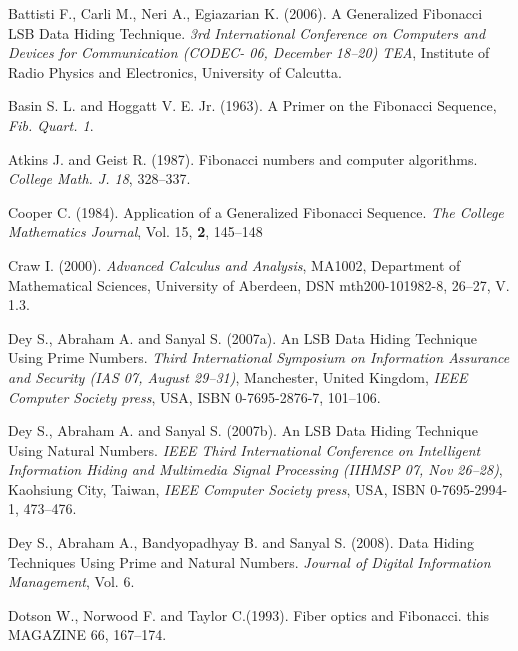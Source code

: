 \documentclass{ijcsa}
\begin{document}
\begin{thebibliography}

Battisti F., Carli M., Neri A., Egiazarian K. (2006). A Generalized Fibonacci LSB Data Hiding
Technique. {\it  3rd International Conference on Computers and Devices for Communication (CODEC-
06, December 18--20) TEA}, Institute of Radio Physics and Electronics, University of Calcutta.

Basin S. L. and Hoggatt V. E. Jr. (1963). A Primer on the Fibonacci Sequence, {\it Fib. Quart. 1}.

Atkins J. and Geist R. (1987). Fibonacci numbers and computer algorithms. {\it College Math. J. 18}, 328--337.

Cooper C. (1984). Application of a Generalized Fibonacci Sequence. {\it The College Mathematics Journal}, {Vol. 15}, {\bf 2}, 145--148

Craw I. (2000). {\it Advanced Calculus and Analysis}, MA1002, Department of Mathematical Sciences, University of Aberdeen,  
DSN mth200-101982-8, 26--27, V. 1.3.

Dey S., Abraham A. and Sanyal S. (2007a). An LSB Data Hiding Technique Using Prime Numbers. {\it Third International Symposium on Information Assurance and Security (IAS 07, August 29--31)}, Manchester, United Kingdom, {\it IEEE Computer Society press}, USA, ISBN 0-7695-2876-7, 101--106. 

Dey S., Abraham A. and Sanyal S. (2007b). An LSB Data Hiding Technique Using Natural Numbers. {\it IEEE Third International Conference on Intelligent Information Hiding and Multimedia Signal Processing (IIHMSP 07, Nov 26--28)}, Kaohsiung City, Taiwan, {\it IEEE Computer Society press}, USA, ISBN 0-7695-2994-1, 473--476. 

Dey S., Abraham A., Bandyopadhyay B. and Sanyal S. (2008). Data Hiding Techniques Using Prime and Natural Numbers.  {\it Journal of Digital Information Management}, {Vol. 6}.

Dotson W., Norwood F. and Taylor C.(1993). Fiber optics and Fibonacci. this MAGAZINE 66, 167--174.


\end{thebibliography}
\end{document}
